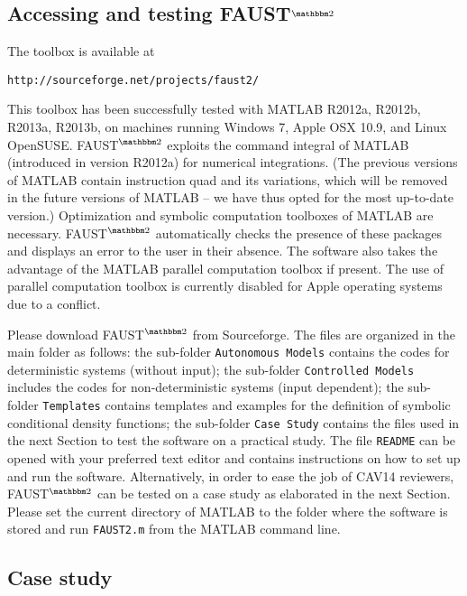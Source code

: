 \documentclass{llncs}
\newcommand{\software}{\textsf{FAUST}$^{\mathbbm 2}$\xspace}
\begin{document}
\subsection*{Accessing and testing \software}
The toolbox is available at
\vspace{-0.2cm}
\begin{center}
{\small\texttt{http://sourceforge.net/projects/faust2/}}
\end{center}
This toolbox has been successfully tested with MATLAB R2012a, R2012b, R2013a, R2013b, 
on machines running Windows 7, Apple OSX 10.9, and Linux OpenSUSE.  
\software exploits the command \textsf{integral} of MATLAB (introduced in version R2012a) for numerical integrations. 
(The previous versions of MATLAB contain instruction \textsf{quad} and its variations, 
which will be removed in the future versions of MATLAB -- 
we have thus opted for the most up-to-date version.)
Optimization and symbolic computation toolboxes of MATLAB are necessary.
\software automatically checks the presence of these packages and displays an error to the user in their absence.
The software also takes the advantage of the MATLAB parallel computation toolbox if present.     
The use of parallel computation toolbox is currently disabled for Apple operating systems due to a conflict. 

Please download \software from Sourceforge. 
The files are organized in the main folder as follows:
the sub-folder \texttt{Autonomous Models} contains the codes for deterministic systems (without input);
the sub-folder \texttt{Controlled Models} includes the codes for non-deterministic systems (input dependent);
the sub-folder \texttt{Templates} contains templates and examples for the definition of symbolic conditional density functions; 
the sub-folder \texttt{Case Study} contains the files used in the next Section to test the software on a practical study.
The file \texttt{README} can be opened with your preferred text editor and contains instructions on how to set up and run the software.
Alternatively, in order to ease the job of CAV14 reviewers, 
\software can be tested on a case study as elaborated in the next Section.  
Please set the current directory of MATLAB to the folder where the software is stored and run \texttt{FAUST2.m} from the MATLAB command line. 

\subsection*{Case study}
\label{CB}
\end{document}
